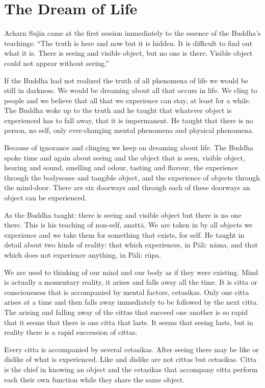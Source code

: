 \chapter{The Dream of Life}

Acharn Sujin came at the first session
immediately to the essence of the Buddha's teachings: ``The truth is
here and now but it is hidden. It is difficult to find out what it is.
There is seeing and visible object, but no one is there. Visible object
could not appear without seeing.''

If the Buddha had not realized the
truth of all phenomena of life we would be still in darkness. We would
be dreaming about all that occurs in life. We cling to people and we
believe that all that we experience can stay, at least for a while. The
Buddha woke up to the truth and he taught that whatever object is
experienced has to fall away, that it is impermanent. He taught that
there is no person, no self, only ever-changing mental phenomena and
physical phenomena. 

Because of ignorance and clinging we
keep on dreaming about life. The Buddha spoke time and again about
seeing and the object that is seen, visible object, hearing and sound,
smelling and odour, tasting and flavour, the experience through the
bodysense and tangible object, and the experience of objects through the
mind-door. There are six doorways and through each of these doorways an
object can be experienced. 

As the Buddha taught: there is seeing
and visible object but there is no one there. This is his teaching of
non-self, anattā. We are taken in by all objects we experience and we
take them for something that exists, for self. He taught in detail about
two kinds of reality: that which experiences, in Pāli: nāma, and that
which does not experience anything, in Pāli: rūpa. 

We are used to thinking of our mind and
our body as if they were existing. Mind is actually a momentary reality,
it arises and falls away all the time. It is citta or consciousness that
is accompanied by mental factors, cetasikas. Only one citta arises at a
time and then falls away immediately to be followed by the next citta.
The arising and falling away of the cittas that succeed one another is
so rapid that it seems that there is one citta that lasts. It seems that
seeing lasts, but in reality there is a rapid succession of cittas. 

Every citta is accompanied by several
cetasikas. After seeing there may be like or dislike of what is
experienced. Like and dislike are not cittas but cetasikas. Citta is the
chief in knowing an object and the cetasikas that accompany citta
perform each their own function while they share the same object. 

